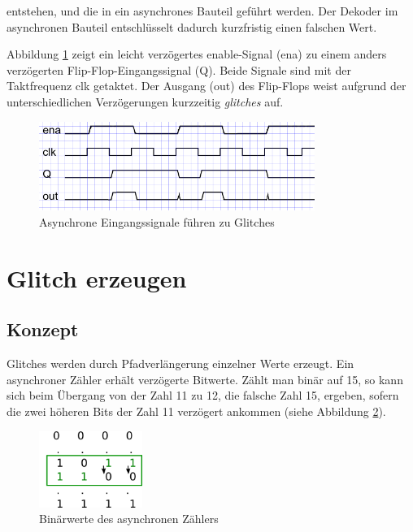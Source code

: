 entstehen, und die in ein asynchrones Bauteil geführt werden. Der Dekoder im asynchronen Bauteil entschlüsselt dadurch kurzfristig einen falschen Wert.

Abbildung \ref{fig.glitch.bild1} zeigt ein leicht verzögertes enable-Signal (ena) zu einem anders verzögerten Flip-Flop-Eingangssignal (Q). Beide Signale sind mit der Taktfrequenz clk getaktet. Der Ausgang (out) des Flip-Flops weist aufgrund der unterschiedlichen Verzögerungen kurzzeitig \textit{glitches} auf. \\
\begin{figure}[H]
	\includegraphics[width=0.8\textwidth]{images/glitch/def_glitch_3.png}
	\caption{Asynchrone Eingangssignale führen zu Glitches}
	\label{fig.glitch.bild1}
\end{figure}


\newpage
\section{Glitch erzeugen}\label{sect.glitch_detect}


\subsection{Konzept}
Glitches werden durch Pfadverlängerung einzelner Werte erzeugt. Ein asynchroner Zähler erhält verzögerte Bitwerte. Zählt man binär auf 15, so kann sich beim Übergang von der Zahl 11 zu 12, die falsche Zahl 15, ergeben, sofern die zwei höheren Bits der Zahl 11 verzögert ankommen (siehe Abbildung \ref {fig.glitch.binaer_zahlen}).

\begin{figure}[H]
	\includegraphics[width=0.3\textwidth]{images/glitch/konzept_verzoegerung.png}
	\caption{Binärwerte des asynchronen Zählers}
	\label{fig.glitch.binaer_zahlen}
\end{figure}

